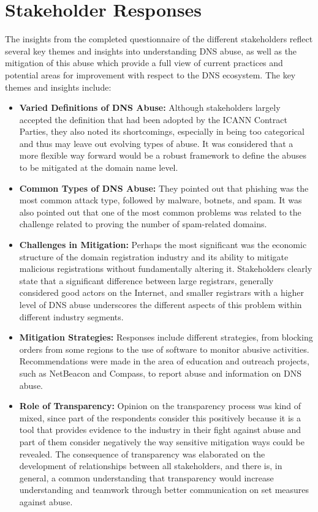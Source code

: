 \section{Stakeholder Responses} 

The insights from the completed questionnaire of the different stakeholders reflect several key themes and insights into understanding DNS abuse, as well as the mitigation of this abuse which provide a full view of current practices and potential areas for improvement with respect to the DNS ecosystem. The key themes and insights include:



\begin{itemize}
  \item \textbf{Varied Definitions of DNS Abuse:} Although stakeholders largely accepted the definition that had been adopted by the ICANN Contract Parties, they also noted its shortcomings, especially in being too categorical and thus may leave out evolving types of abuse. It was considered that a more flexible way forward would be a robust framework to define the abuses to be mitigated at the domain name level.
  
  \item \textbf{Common Types of DNS Abuse:} They pointed out that phishing was the most common attack type, followed by malware, botnets, and spam. It was also pointed out that one of the most common problems was related to the challenge related to proving the number of spam-related domains.
  
  \item \textbf{Challenges in Mitigation:} Perhaps the most significant was the economic structure of the domain registration industry and its ability to mitigate malicious registrations without fundamentally altering it. Stakeholders clearly state that a significant difference between large registrars, generally considered good actors on the Internet, and smaller registrars with a higher level of DNS abuse underscores the different aspects of this problem within different industry segments.
  
  \item \textbf{Mitigation Strategies:} Responses include different strategies, from blocking orders from some regions to the use of software to monitor abusive activities. Recommendations were made in the area of education and outreach projects, such as NetBeacon and Compass, to report abuse and information on DNS abuse.
  
  \item \textbf{Role of Transparency:} Opinion on the transparency process was kind of mixed, since part of the respondents consider this positively because it is a tool that provides evidence to the industry in their fight against abuse and part of them consider negatively the way sensitive mitigation ways could be revealed. The consequence of transparency was elaborated on the development of relationships between all stakeholders, and there is, in general, a common understanding that transparency would increase understanding and teamwork through better communication on set measures against abuse.
  
\end{itemize}

